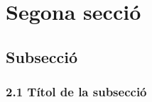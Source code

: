 \documentclass[aspectratio=169]{beamer}
\begin{document}
\section{Segona secció}
\subsection{Subsecció}

\begin{frame}[t]
  \frametitle{2.1 Títol de la subsecció}
\end{frame}
\end{document}
